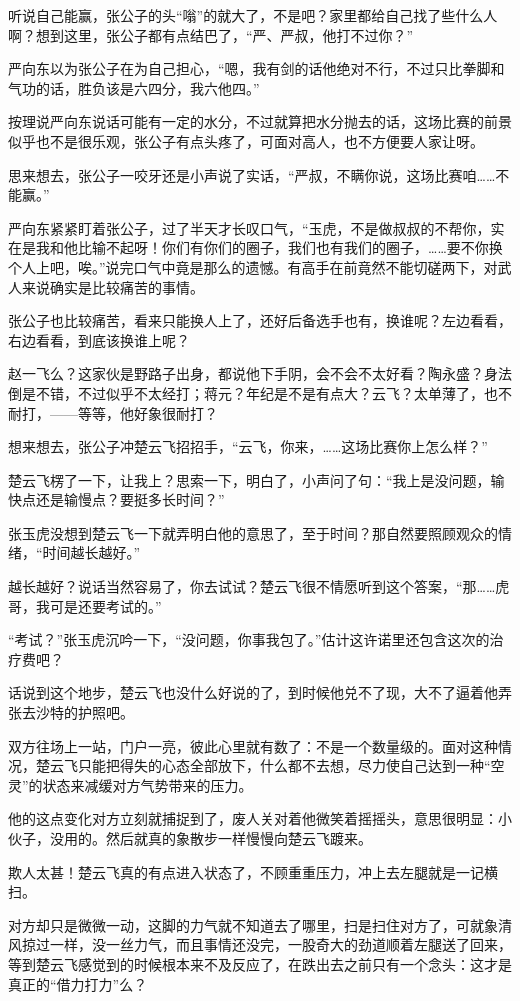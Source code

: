 听说自己能赢，张公子的头“嗡”的就大了，不是吧？家里都给自己找了些什么人啊？想到这里，张公子都有点结巴了，“严、严叔，他打不过你？”

严向东以为张公子在为自己担心，“嗯，我有剑的话他绝对不行，不过只比拳脚和气功的话，胜负该是六四分，我六他四。”

按理说严向东说话可能有一定的水分，不过就算把水分抛去的话，这场比赛的前景似乎也不是很乐观，张公子有点头疼了，可面对高人，也不方便要人家让呀。

思来想去，张公子一咬牙还是小声说了实话，“严叔，不瞒你说，这场比赛咱……不能赢。”

严向东紧紧盯着张公子，过了半天才长叹口气，“玉虎，不是做叔叔的不帮你，实在是我和他比输不起呀！你们有你们的圈子，我们也有我们的圈子，……要不你换个人上吧，唉。”说完口气中竟是那么的遗憾。有高手在前竟然不能切磋两下，对武人来说确实是比较痛苦的事情。

张公子也比较痛苦，看来只能换人上了，还好后备选手也有，换谁呢？左边看看，右边看看，到底该换谁上呢？

赵一飞么？这家伙是野路子出身，都说他下手阴，会不会不太好看？陶永盛？身法倒是不错，不过似乎不太经打；蒋元？年纪是不是有点大？云飞？太单薄了，也不耐打，——等等，他好象很耐打？

想来想去，张公子冲楚云飞招招手，“云飞，你来，……这场比赛你上怎么样？”

楚云飞楞了一下，让我上？思索一下，明白了，小声问了句：“我上是没问题，输快点还是输慢点？要挺多长时间？”

张玉虎没想到楚云飞一下就弄明白他的意思了，至于时间？那自然要照顾观众的情绪，“时间越长越好。”

越长越好？说话当然容易了，你去试试？楚云飞很不情愿听到这个答案，“那……虎哥，我可是还要考试的。”

“考试？”张玉虎沉吟一下，“没问题，你事我包了。”估计这许诺里还包含这次的治疗费吧？

话说到这个地步，楚云飞也没什么好说的了，到时候他兑不了现，大不了逼着他弄张去沙特的护照吧。

双方往场上一站，门户一亮，彼此心里就有数了：不是一个数量级的。面对这种情况，楚云飞只能把得失的心态全部放下，什么都不去想，尽力使自己达到一种“空灵”的状态来减缓对方气势带来的压力。

他的这点变化对方立刻就捕捉到了，废人关对着他微笑着摇摇头，意思很明显：小伙子，没用的。然后就真的象散步一样慢慢向楚云飞踱来。

欺人太甚！楚云飞真的有点进入状态了，不顾重重压力，冲上去左腿就是一记横扫。

对方却只是微微一动，这脚的力气就不知道去了哪里，扫是扫住对方了，可就象清风掠过一样，没一丝力气，而且事情还没完，一股奇大的劲道顺着左腿送了回来，等到楚云飞感觉到的时候根本来不及反应了，在跌出去之前只有一个念头：这才是真正的“借力打力”么？

